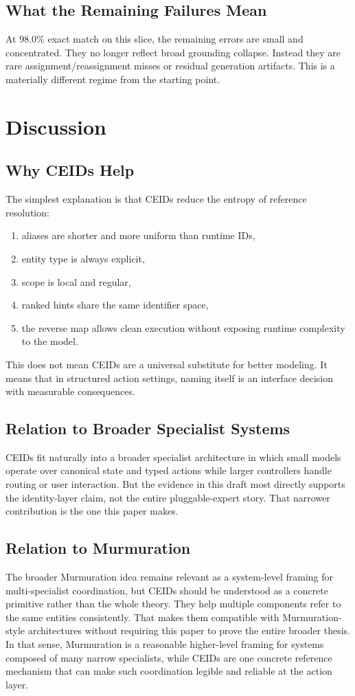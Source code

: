 \documentclass[11pt]{article}
\begin{document}
\subsection{What the Remaining Failures Mean}
At 98.0\% exact match on this slice, the remaining errors are small and concentrated. They no longer reflect broad grounding collapse. Instead they are rare assignment/reassignment misses or residual generation artifacts. This is a materially different regime from the starting point.

\section{Discussion}
\subsection{Why CEIDs Help}
The simplest explanation is that CEIDs reduce the entropy of reference resolution:
\begin{enumerate}[leftmargin=*,itemsep=0.25em]
  \item aliases are shorter and more uniform than runtime IDs,
  \item entity type is always explicit,
  \item scope is local and regular,
  \item ranked hints share the same identifier space,
  \item the reverse map allows clean execution without exposing runtime complexity to the model.
\end{enumerate}

This does not mean CEIDs are a universal substitute for better modeling. It means that in structured action settings, naming itself is an interface decision with measurable consequences.

\subsection{Relation to Broader Specialist Systems}
CEIDs fit naturally into a broader specialist architecture in which small models operate over canonical state and typed actions while larger controllers handle routing or user interaction. But the evidence in this draft most directly supports the identity-layer claim, not the entire pluggable-expert story. That narrower contribution is the one this paper makes.

\subsection{Relation to Murmuration}
The broader Murmuration idea remains relevant as a system-level framing for multi-specialist coordination, but CEIDs should be understood as a concrete primitive rather than the whole theory. They help multiple components refer to the same entities consistently. That makes them compatible with Murmuration-style architectures without requiring this paper to prove the entire broader thesis. In that sense, Murmuration is a reasonable higher-level framing for systems composed of many narrow specialists, while CEIDs are one concrete reference mechanism that can make such coordination legible and reliable at the action layer.
\end{document}
